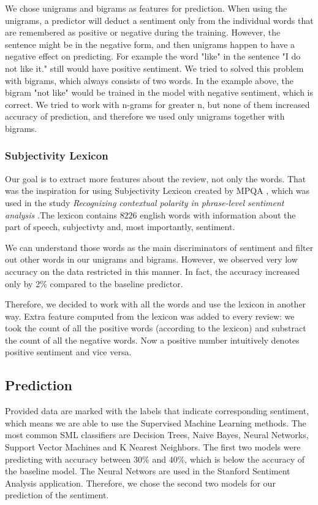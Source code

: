 \documentclass{sig-alternate}
\begin{document}
We chose unigrams and bigrams as features for prediction.
When using the unigrams, a predictor will deduct a sentiment only from the individual words that are remembered as positive or negative during the training.
However, the sentence might be in the negative form, and then unigrams happen to have a negative effect on predicting.
For example the word "like" in the sentence "I do not like it." still would have positive sentiment.
We tried to solved this problem with bigrams, which always consists of two words.
In the example above, the bigram "not like" would be trained in the model with negative sentiment, which is correct.
We tried to work with n-grams for greater n, but none of them increased accuracy of prediction, and therefore we used only unigrams together with bigrams.

\subsubsection{Subjectivity Lexicon}
Our goal is to extract more features about the review, not only the words.
That was the inspiration for using Subjectivity Lexicon created by MPQA \cite{mpqa}, which was used in the study {\it Recognizing contextual polarity in phrase-level sentiment analysis} \cite{lex}.The lexicon contains $8226$ english words with information about the part of speech, subjectivty and, most importantly, sentiment.

We can understand those words as the main discriminators of sentiment and filter out other words in our unigrams and bigrams.
However, we observed very low accuracy on the data restricted in this manner.
In fact, the accuracy increased only by 2\% compared to the baseline predictor.

Therefore, we decided to work with all the words and use the lexicon in another way.
Extra feature computed from the lexicon was added to every review:
we took the count of all the positive words (according to the lexicon) and substract the count of all the negative words.
Now a positive number intuitively denotes positive sentiment and vice versa.

\subsection{Prediction}
Provided data are marked with the labels that indicate corresponding sentiment, which means we are able to use the Supervised Machine Learning methods.
The most common SML classifiers are Decision Trees, Naive Bayes, Neural Networks, Support Vector Machines and K Nearest Neighbors.
The first two models were predicting with accuracy between $30\%$ and $40\%$, which is below the accuracy of the baseline model.
The Neural Networs are used in the Stanford Sentiment Analysis application.
Therefore, we chose the second two models for our prediction of the sentiment.
\end{document}
